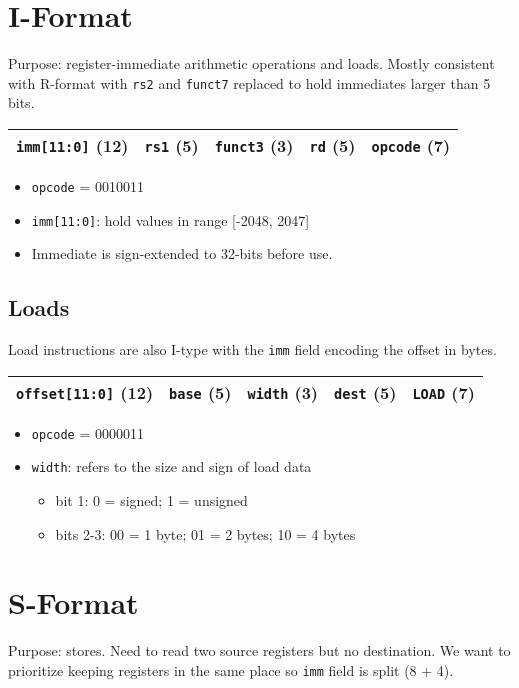 \section{I-Format}
Purpose: register-immediate arithmetic operations and loads. Mostly consistent with R-format with \texttt{rs2} and \texttt{funct7} replaced to hold immediates larger than 5 bits.

\medskip
\begin{tabular}{|c|c|c|c|c|}
    \hline
    \texttt{imm[11:0]} (12) &
    \texttt{rs1} (5) &
    \texttt{funct3} (3) &
    \texttt{rd} (5) &
    \texttt{opcode} (7) \\
    \hline
\end{tabular}
\begin{itemize}
    \item \texttt{opcode} = 0010011
    \item \texttt{imm[11:0]}: hold values in range [-2048, 2047]
    \item Immediate is sign-extended to 32-bits before use.
\end{itemize}

\subsection{Loads}
Load instructions are also I-type with the \texttt{imm} field encoding the offset in bytes.

\medskip
\begin{tabular}{|c|c|c|c|c|}
    \hline
    \texttt{offset[11:0]} (12) &
    \texttt{base} (5) &
    \texttt{width} (3) &
    \texttt{dest} (5) &
    \texttt{LOAD} (7) \\
    \hline
\end{tabular}
\begin{itemize}
    \item \texttt{opcode} = 0000011
    \item \texttt{width}: refers to the size and sign of load data
    \begin{itemize}
        \item bit 1: 0 = signed; 1 = unsigned
        \item bits 2-3: 00 = 1 byte; 01 = 2 bytes; 10 = 4 bytes
    \end{itemize}
\end{itemize}

\section{S-Format}
Purpose: stores. Need to read two source registers but no destination. We want to prioritize keeping registers in the same place so \texttt{imm} field is split (8 + 4).

